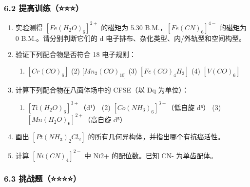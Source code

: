 \documentclass[a4paper,11pt]{ctexart}
\providecommand{\tightlist}{\setlength{\itemsep}{0pt}\setlength{\parskip}{0pt}}
\begin{document}
\subsubsection{6.2 提高训练（⭐⭐⭐）}\label{ux63d0ux9ad8ux8badux7ec3}

\begin{enumerate}
\def\labelenumi{\arabic{enumi}.}
\setcounter{enumi}{4}
\item
  实验测得 \([Fe(H_2O)_6]^{2+}\) 的磁矩为 5.30 B.M.，\([Fe(CN)_6]^{4-}\) 的磁矩为 0 B.M.。请分别判断它们的 d 电子排布、杂化类型、内/外轨型和空间构型。
\item
  验证下列配合物是否符合 18 电子规则：

  \begin{enumerate}
  \def\labelenumii{(\arabic{enumii})}
  \tightlist
  \item
    \([Cr(CO)_6]\) (2) \([Mn_2(CO)_{10]}\) (3) \([Fe(CO)_4H_2]\) (4) \([V(CO)_6]\)
  \end{enumerate}
\item
  计算下列配合物在八面体场中的 CFSE（以 Dq 为单位）：

  \begin{enumerate}
  \def\labelenumii{(\arabic{enumii})}
  \tightlist
  \item
    \([Ti(H_2O)_6]^{3+}\)（d¹） (2) \([Co(NH_3)_6]^{3+}\)（低自旋 d⁶） (3) \([Mn(H_2O)_6]^{2+}\)（高自旋 d⁵）
  \end{enumerate}
\item
  画出 \([Pt(NH_3)_2Cl_2]\) 的所有几何异构体，并指出哪个有抗癌活性。
\item
  计算 \([Ni(CN)_4]^{2-}\) 中 Ni2+ 的配位数。已知 CN- 为单齿配体。
\end{enumerate}

\subsubsection{6.3 挑战题（⭐⭐⭐⭐）}\label{ux6311ux6218ux9898}
\end{document}
